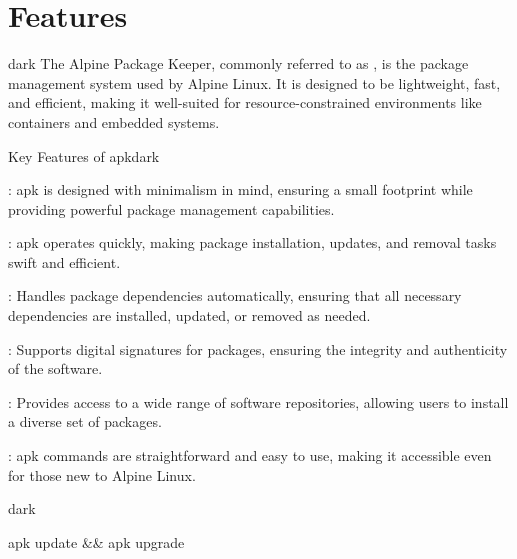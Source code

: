 \section{Features}
\label{Features}

\label{Alpine Package Keeper}
\begin{baseBoxThree}{}{dark}
    \bigskip
    The Alpine Package Keeper, commonly referred to as , is the package management system used by Alpine Linux.
    It is designed to be lightweight, fast, and efficient, making it well-suited for resource-constrained environments like containers and embedded systems.
    \bigskip
    \begin{baseBoxThree}{Key Features of apk}{dark}
        \smallskip
        \begin{posnexItemize} 
            \item[\sA] : apk is designed with minimalism in mind, ensuring a small footprint while providing powerful package management capabilities.
            \item[\sA] : apk operates quickly, making package installation, updates, and removal tasks swift and efficient.
            \item[\sA] : Handles package dependencies automatically, ensuring that all necessary dependencies are installed, updated, or removed as needed.
            \item[\sA] : Supports digital signatures for packages, ensuring the integrity and authenticity of the software.
            \item[\sA] : Provides access to a wide range of software repositories, allowing users to install a diverse set of packages.
            \item[\sA] : apk commands are straightforward and easy to use, making it accessible even for those new to Alpine Linux.
        \end{posnexItemize}
        \smallskip
    \end{baseBoxThree}
    \smallskip
    \begin{baseBoxThree}{}{dark}
        \begin{posnex}
apk update && apk upgrade
        \end{posnex}
    \end{baseBoxThree}
    \smallskip
\end{baseBoxThree}
